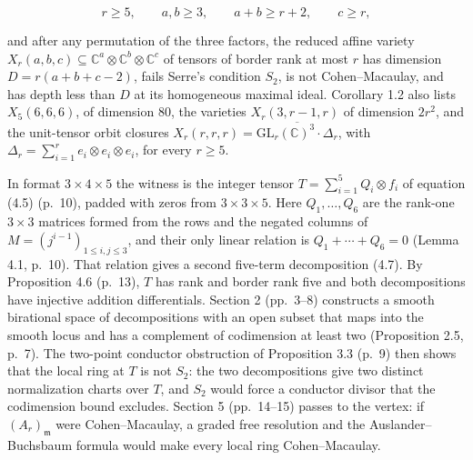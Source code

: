 \documentclass[11pt,a4paper]{article}
\begin{document}
\[r\geq5,\qquad a,b\geq3,\qquad a+b\geq r+2,\qquad c\geq r,\]

and after any permutation of the three factors, the reduced affine
variety
\(X_r(a,b,c)\subseteq\mathbb C^a\otimes\mathbb C^b\otimes\mathbb C^c\)
of tensors of border rank at most \(r\) has dimension \(D=r(a+b+c-2)\),
fails Serre's condition \(S_2\), is not Cohen--Macaulay, and has depth
less than \(D\) at its homogeneous maximal ideal. Corollary 1.2 also
lists \(X_5(6,6,6)\), of dimension \(80\), the varieties
\(X_r(3,r-1,r)\) of dimension \(2r^2\), and the unit-tensor orbit
closures
\(X_r(r,r,r)=\overline{\mathrm{GL}_r(\mathbb C)^3\cdot\Delta_r}\), with
\(\Delta_r=\sum_{i=1}^re_i\otimes e_i\otimes e_i\), for every
\(r\geq5\).

In format \(3\times4\times5\) the witness is the integer tensor
\(T=\sum_{i=1}^5Q_i\otimes f_i\) of equation (4.5) (p.~10), padded with
zeros from \(3\times3\times5\). Here \(Q_1,\ldots,Q_6\) are the rank-one
\(3\times3\) matrices formed from the rows and the negated columns of
\(M=(j^{i-1})_{1\leq i,j\leq3}\), and their only linear relation is
\(Q_1+\cdots+Q_6=0\) (Lemma 4.1, p.~10). That relation gives a second
five-term decomposition (4.7). By Proposition 4.6 (p.~13), \(T\) has
rank and border rank five and both decompositions have injective
addition differentials. Section 2 (pp.~3--8) constructs a smooth
birational space of decompositions with an open subset that maps into
the smooth locus and has a complement of codimension at least two
(Proposition 2.5, p.~7). The two-point conductor obstruction of
Proposition 3.3 (p.~9) then shows that the local ring at \(T\) is not
\(S_2\): the two decompositions give two distinct normalization charts
over \(T\), and \(S_2\) would force a conductor divisor that the
codimension bound excludes. Section 5 (pp.~14--15) passes to the vertex:
if \((A_r)_{\mathfrak m}\) were Cohen--Macaulay, a graded free
resolution and the Auslander--Buchsbaum formula would make every local
ring Cohen--Macaulay.
\end{document}
